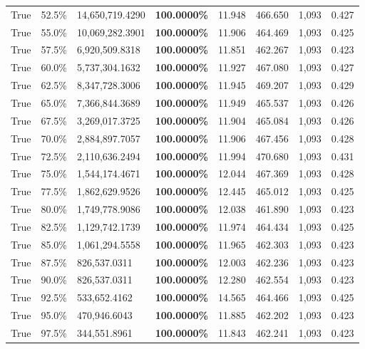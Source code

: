 \begin{table}[H]
\begin{tabular}{lllrllll}
\cline{1-8}
True & 52.5\% & 14,650,719.4290 & \bfseries \color{red} 100.0000\% & 11.948 & 466.650 & 1,093 & 0.427 \\
\cline{1-8}
True & 55.0\% & 10,069,282.3901 & \bfseries \color{red} 100.0000\% & 11.906 & 464.469 & 1,093 & 0.425 \\
\cline{1-8}
True & 57.5\% & 6,920,509.8318 & \bfseries \color{red} 100.0000\% & 11.851 & 462.267 & 1,093 & 0.423 \\
\cline{1-8}
True & 60.0\% & 5,737,304.1632 & \bfseries \color{red} 100.0000\% & 11.927 & 467.080 & 1,093 & 0.427 \\
\cline{1-8}
True & 62.5\% & 8,347,728.3006 & \bfseries \color{red} 100.0000\% & 11.945 & 469.207 & 1,093 & 0.429 \\
\cline{1-8}
True & 65.0\% & 7,366,844.3689 & \bfseries \color{red} 100.0000\% & 11.949 & 465.537 & 1,093 & 0.426 \\
\cline{1-8}
True & 67.5\% & 3,269,017.3725 & \bfseries \color{red} 100.0000\% & 11.904 & 465.084 & 1,093 & 0.426 \\
\cline{1-8}
True & 70.0\% & 2,884,897.7057 & \bfseries \color{red} 100.0000\% & 11.906 & 467.456 & 1,093 & 0.428 \\
\cline{1-8}
True & 72.5\% & 2,110,636.2494 & \bfseries \color{red} 100.0000\% & 11.994 & 470.680 & 1,093 & 0.431 \\
\cline{1-8}
True & 75.0\% & 1,544,174.4671 & \bfseries \color{red} 100.0000\% & 12.044 & 467.369 & 1,093 & 0.428 \\
\cline{1-8}
True & 77.5\% & 1,862,629.9526 & \bfseries \color{red} 100.0000\% & 12.445 & 465.012 & 1,093 & 0.425 \\
\cline{1-8}
True & 80.0\% & 1,749,778.9086 & \bfseries \color{red} 100.0000\% & 12.038 & 461.890 & 1,093 & 0.423 \\
\cline{1-8}
True & 82.5\% & 1,129,742.1739 & \bfseries \color{red} 100.0000\% & 11.974 & 464.434 & 1,093 & 0.425 \\
\cline{1-8}
True & 85.0\% & 1,061,294.5558 & \bfseries \color{red} 100.0000\% & 11.965 & 462.303 & 1,093 & 0.423 \\
\cline{1-8}
True & 87.5\% & 826,537.0311 & \bfseries \color{red} 100.0000\% & 12.003 & 462.236 & 1,093 & 0.423 \\
\cline{1-8}
True & 90.0\% & 826,537.0311 & \bfseries \color{red} 100.0000\% & 12.280 & 462.554 & 1,093 & 0.423 \\
\cline{1-8}
True & 92.5\% & 533,652.4162 & \bfseries \color{red} 100.0000\% & 14.565 & 464.466 & 1,093 & 0.425 \\
\cline{1-8}
True & 95.0\% & 470,946.6043 & \bfseries \color{red} 100.0000\% & 11.885 & 462.202 & 1,093 & 0.423 \\
\cline{1-8}
True & 97.5\% & 344,551.8961 & \bfseries \color{red} 100.0000\% & 11.843 & 462.241 & 1,093 & 0.423 \\
\cline{1-8}
\bottomrule
\end{tabular}
\end{table}
